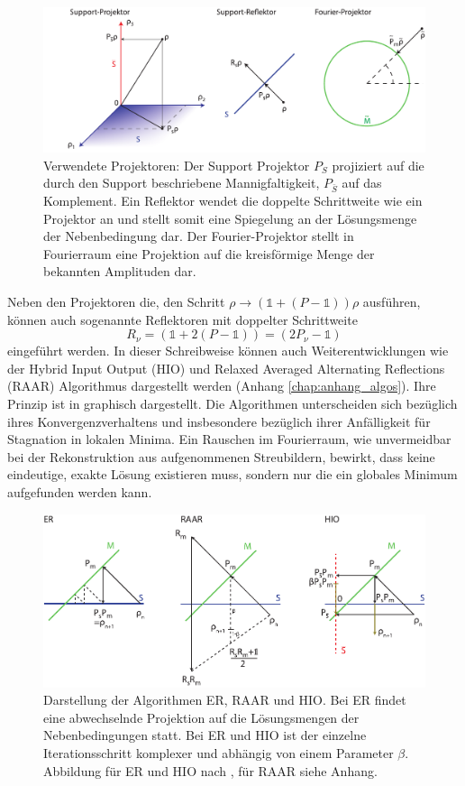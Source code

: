 \begin{figure}
	\centering
	\includegraphics[width=1\textwidth]{images/projektor.pdf}
	\caption[Projektoren]{Verwendete Projektoren: Der Support Projektor $P_S$ projiziert auf die durch den Support beschriebene Mannigfaltigkeit, $P_{\bar{S}}$ auf das Komplement. Ein Reflektor wendet die doppelte Schrittweite wie ein Projektor an und stellt somit eine Spiegelung an der Lösungsmenge der Nebenbedingung dar. Der Fourier-Projektor stellt in Fourierraum eine Projektion auf die kreisförmige Menge der bekannten Amplituden dar.}
	\label{fig:projektoren}
\end{figure}
Neben den Projektoren die, den Schritt $\rho\rightarrow (\mathbb{1}+(P-\mathbb{1}))\rho$ ausführen, können auch sogenannte Reflektoren mit doppelter Schrittweite
\begin{equation}
	R_\nu= (\mathbb{1}+2(P-\mathbb{1}))=(2P_\nu-\mathbb{1})
\end{equation}
eingeführt werden.
In dieser Schreibweise können auch Weiterentwicklungen wie der Hybrid Input Output (HIO) und Relaxed Averaged Alternating Reflections (RAAR) Algorithmus dargestellt werden (Anhang \ref{chap:anhang_algos}). Ihre Prinzip ist in  graphisch dargestellt. Die Algorithmen unterscheiden sich bezüglich ihres Konvergenzverhaltens und insbesondere bezüglich ihrer Anfälligkeit für Stagnation in lokalen Minima. 
Ein Rauschen im Fourierraum, wie unvermeidbar bei der Rekonstruktion aus aufgenommenen Streubildern, bewirkt, dass keine eindeutige, exakte Lösung existieren muss, sondern nur die ein globales Minimum aufgefunden werden kann. 
\begin{figure}
	\centering
	\includegraphics[width=1\textwidth]{images/algorithmen.pdf}
	\caption[Rekonstruktionsalgorithmen]{Darstellung der Algorithmen ER, RAAR und HIO. Bei ER findet eine abwechselnde Projektion auf die Lösungsmengen der Nebenbedingungen statt. Bei ER und HIO ist der einzelne Iterationsschritt komplexer und abhängig von einem Parameter $\beta$. Abbildung für ER und HIO nach \cite{marchesini2007}, für RAAR siehe Anhang.}
	\label{fig:recon}
\end{figure} 
